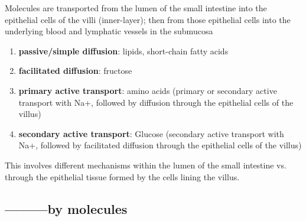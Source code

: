 Molecules are transported from the lumen of the small intestine into the
epithelial cells of the villi (inner-layer); then from those epithelial cells
into the underlying blood and lymphatic vessels in the submucosa
\begin{enumerate}
  \item {\bf passive/simple diffusion}: lipids, short-chain fatty acids
  
  \item {\bf facilitated diffusion}: fructose
  
  \item {\bf primary active transport}: amino acids  (primary or secondary
  active transport with Na+, followed by diffusion through the epithelial cells of the villus)
  
  \item {\bf secondary active transport}: Glucose (secondary active transport
  with Na+, followed by facilitated diffusion through the epithelial cells of the villus)
\end{enumerate}
This involves different mechanisms within the lumen of the small intestine vs.
through the epithelial tissue formed by the cells lining the villus.

\subsection{---------by molecules}

